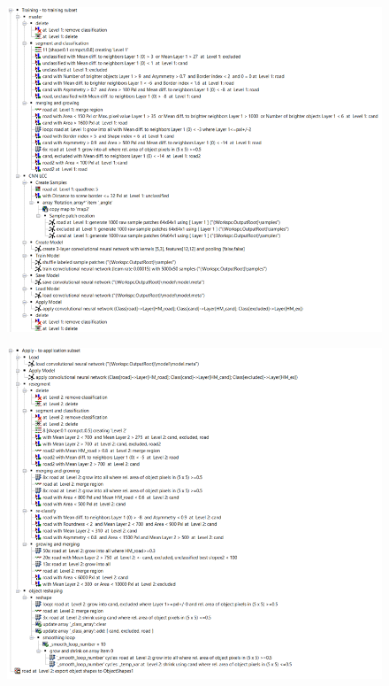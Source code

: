 \documentclass[remotesensing,article,accept,pdftex,moreauthors]{Definitions/mdpi}
\begin{document}
\begin{figure}[H]
\includegraphics[width=12 cm]{appendix1.png}
\end{figure}   

\vspace{-12pt}

\begin{figure}[H]
\includegraphics[width=12 cm]{appendix2.png}
\end{figure}   
\end{document}
